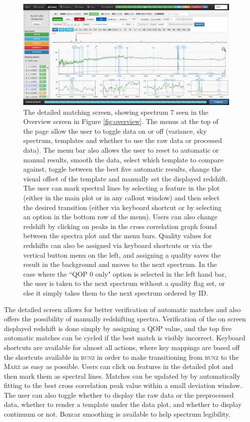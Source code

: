 \documentclass[iop]{emulateapj}
\newcommand{\runz}{\textsc{runz}}
\newcommand{\marz}{\textsc{Marz}}
\begin{document}
\begin{figure}[H]
\centering
\includegraphics[width=\textwidth]{InterfaceZ2.png}
\caption{The detailed matching screen, showing spectrum 7 seen in the Overview screen in Figure \ref{fig:overview}. The menus at the top of the page allow the user to toggle data on or off (variance, sky spectrum, templates and whether to use the raw data or processed data). The menu bar also allows the user to reset to automatic or manual results, smooth the data, select which template to compare against, toggle between the best five automatic results, change the visual offset of the template and manually set the displayed redshift. The user can mark spectral lines by selecting a feature in the plot (either in the main plot or in any callout window) and then select the desired transition (either via keyboard shortcut or by selecting an option in the bottom row of the menu). Users can also change redshift by clicking on peaks in the cross correlation graph found between the spectra plot and the menu bars. Quality values for redshifts can also be assigned via keyboard shortcuts or via the vertical button menu on the left, and assigning a quality saves the result in the background and moves to the next spectrum. In the case where the ``QOP 0 only" option is selected in the left hand bar, the user is taken to the next spectrum without a quality flag set, or else it simply takes them to the next spectrum ordered by ID.}
\label{fig:detailed}
\end{figure}

The detailed screen allows for better verification of automatic matches and also offers the possibility of manually redshifting spectra. Verification of the on screen displayed redshift is done simply by assigning a QOP value, and the top five automatic matches can be cycled if the best match is visibly incorrect. Keyboard shortcuts are available for almost all actions, where key mappings are based off the shortcuts available in \runz{} in order to make transitioning from \runz{} to the \marz{} as easy as possible. Users can click on features in the detailed plot and then mark them as spectral lines. Matches can be updated by by automatically fitting to the best cross correlation peak value within a small deviation window. The user can also toggle whether to display the raw data or the preprocessed data, whether to render a template under the data plot, and whether to display continuum or not. Boxcar smoothing is available to help spectrum legibility.\\
\end{document}
